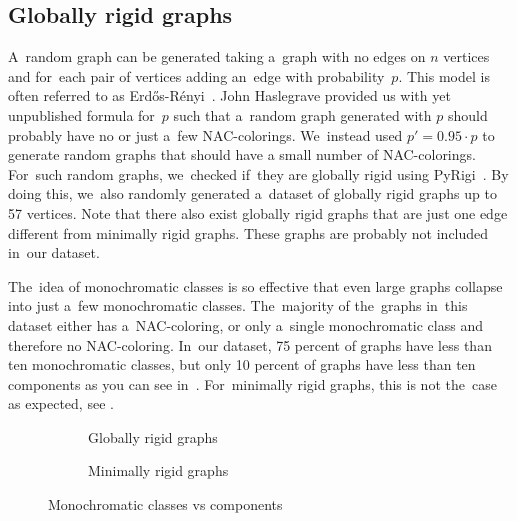 \subsection*{Globally rigid graphs}

A~random graph can be generated taking a~graph with no edges on \( n \) vertices
and for~each pair of vertices adding an~edge with probability~\( p \).
This model is often referred to as Erdős-Rényi~\cite{random_gnp}.
%
John Haslegrave provided us with yet unpublished formula for~\( p \)
such that a~random graph generated with \( p \)
should probably have no or just a~few NAC-colorings.
%
We~instead used \( p' = 0.95\cdot p \) to generate random graphs that
should have a small number of NAC-colorings.
For~such random graphs, we~checked if~they are globally rigid using PyRigi~\cite{pyrigi}.
%
By doing this, we~also randomly generated a~dataset of globally rigid graphs
up to 57 vertices.
%
Note that there also exist globally rigid graphs
that are just one edge different from minimally rigid graphs.
These graphs are probably not included in~our dataset.

The~idea of monochromatic classes is so effective
that even large graphs collapse into just a~few monochromatic classes.
The~majority of the~graphs in~this dataset either has a~NAC-coloring,
or only a~single monochromatic class and therefore no NAC-coloring.
In~our dataset, 75 percent of graphs have less than ten	monochromatic classes,
but only 10 percent of graphs have less than ten \trcon{} components
as you can see in~.
For~minimally rigid graphs, this is not the~case as expected, see
.
%
\begin{figure}[h!]
	\centering
	\begin{subfigure}{0.48\textwidth}
		\centering
		\scalebox{0.6}{}
		\caption[Monoch. classes vs tri. conn. components for~globally rigid]{%
			\centering Globally rigid graphs}%
		\label{fig:monochrom_vs_triangle_globally_rigid}
	\end{subfigure}
	\hfill
	\begin{subfigure}{0.48\textwidth}
		\centering
		\scalebox{0.6}{}
		\caption[Monoch. classes vs tri. conn. components for~minimally rigid]{%
			\centering Minimally rigid graphs}%
		\label{fig:monochrom_vs_triangle_minimally_rigid}
	\end{subfigure}
	\caption{Monochromatic classes vs \trcon{} components}%
	\label{fig:monochrom_vs_triangle}
\end{figure}

